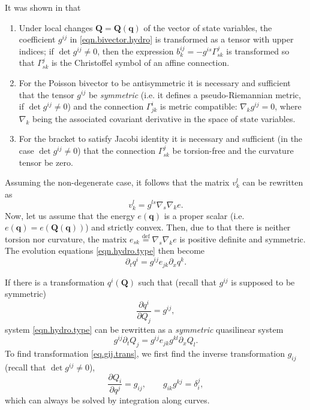 \documentclass[
10pt, %
a4paper, %
oneside, %
headinclude,footinclude, %
BCOR5mm, %
]{scrartcl}
\newcommand{\qq}{\mathbf{q}}
\newcommand{\QQ}{\mathbf{Q}}
\begin{document}
It was shown in \cite{Novikov} that
\begin{enumerate}
\item Under local changes $\QQ = \QQ(\qq)$ of the vector of state variables, the coefficient $g^{ij}$ in \eqref{eqn.bivector.hydro} is transformed as a tensor with upper indices; if $\det g^{ij} \neq 0$, then the expression
		$b^{ij}_k = -g^{is}\Gamma^j_{sk}$ is transformed so that $\Gamma^j_{sk}$ is the Christoffel symbol of an affine connection.
\item  For the Poisson bivector to be antisymmetric it is necessary and sufficient that the
	tensor $g^{ij}$ be \textit{symmetric} (i.e. it defines a pseudo-Riemannian metric, if $\det g^{ij} \neq 0$) and
		the connection $\Gamma^i_{jk}$ is metric compatible: $\nabla_k g^{ij} = 0$, where $\nabla_k$ being the associated covariant derivative in the space of state variables.
	\item  For the bracket to satisfy Jacobi identity it is necessary and sufficient (in the case $\det
	g^{ij} \neq 0 $) that the connection $\Gamma^{j}_{sk}$ be torsion-free and the curvature tensor be zero.
\end{enumerate}
Assuming the non-degenerate case, it follows that the matrix $v^l_k$ can be rewritten as
\begin{equation}
	v^l_k = g^{ls}\nabla_s \nabla_k e.
\end{equation}
Now, let us assume that the energy $e(\qq)$ is a proper scalar (i.e. $e(\qq) = e(\QQ(\qq))$) and strictly
convex. Then, due to that there is neither torsion nor curvature, the matrix
$e_{sk}\stackrel{\mathrm{def}}{=} \nabla_s \nabla_k e$ is positive definite and symmetric. The evolution equations \eqref{eqn.hydro.type} then become
\begin{equation}
	\partial_t q^i = g^{ij} e_{jk}\partial_x q^k.
\end{equation}


If there is a transformation $q^i(\QQ)$ such that (recall that $g^{ij}$ is supposed to be symmetric)
\begin{equation}\label{eq.gij.trans}
 \frac{\partial q^i}{\partial Q_j} = g^{ij},
\end{equation}
system \eqref{eqn.hydro.type} can be rewritten as a \textit{symmetric} quasilinear system
\begin{equation}\label{eqn.symm.quasilin}
	g^{ij}\partial_t Q_j = g^{ij} e_{jk} g^{kl} \partial_x Q_l.
\end{equation}
To find transformation \eqref{eq.gij.trans}, we first find the inverse transformation $g_{ij}$ (recall that $\det g^{ij}\neq 0$), 
\begin{equation}
    \frac{\partial Q_i}{\partial q^j}=g_{ij}, \qquad g_{ik} g^{kj} = \delta_i^j,%
\end{equation}
which can always be solved by integration along curves. 
\end{document}
